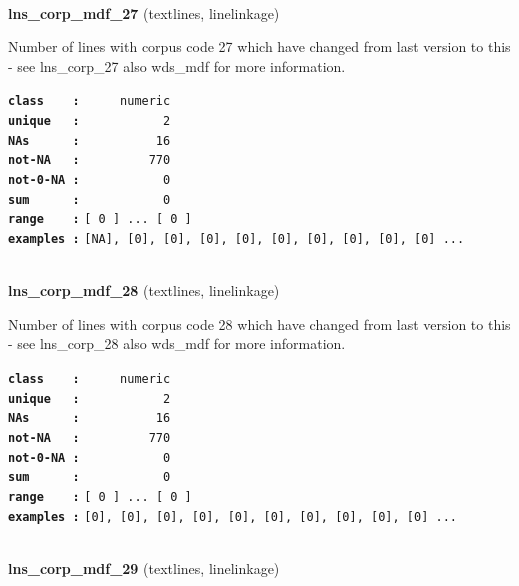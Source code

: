 \documentclass[]{article}
\begin{document}
~

\textbf{lns\_corp\_mdf\_27} (textlines, linelinkage)

Number of lines with corpus code 27 which have changed from last version
to this - see lns\_corp\_27 also wds\_mdf for more information.

\textbf{\texttt{class\ \ \ \ :}} \texttt{~~~~~numeric}\\
\textbf{\texttt{unique\ \ \ :}} \texttt{~~~~~~~~~~~2}\\
\textbf{\texttt{NAs\ \ \ \ \ \ :}} \texttt{~~~~~~~~~~16}\\
\textbf{\texttt{not-NA\ \ \ :}} \texttt{~~~~~~~~~770}\\
\textbf{\texttt{not-0-NA\ :}} \texttt{~~~~~~~~~~~0}\\
\textbf{\texttt{sum\ \ \ \ \ \ :}} \texttt{~~~~~~~~~~~0}\\
\textbf{\texttt{range\ \ \ \ :}}
\texttt{{[}\ 0\ {]}\ ...\ {[}\ 0\ {]}}\\
\textbf{\texttt{examples\ :}}
\texttt{{[}NA{]},\ {[}0{]},\ {[}0{]},\ {[}0{]},\ {[}0{]},\ {[}0{]},\ {[}0{]},\ {[}0{]},\ {[}0{]},\ {[}0{]}\ ...}\\

~

\textbf{lns\_corp\_mdf\_28} (textlines, linelinkage)

Number of lines with corpus code 28 which have changed from last version
to this - see lns\_corp\_28 also wds\_mdf for more information.

\textbf{\texttt{class\ \ \ \ :}} \texttt{~~~~~numeric}\\
\textbf{\texttt{unique\ \ \ :}} \texttt{~~~~~~~~~~~2}\\
\textbf{\texttt{NAs\ \ \ \ \ \ :}} \texttt{~~~~~~~~~~16}\\
\textbf{\texttt{not-NA\ \ \ :}} \texttt{~~~~~~~~~770}\\
\textbf{\texttt{not-0-NA\ :}} \texttt{~~~~~~~~~~~0}\\
\textbf{\texttt{sum\ \ \ \ \ \ :}} \texttt{~~~~~~~~~~~0}\\
\textbf{\texttt{range\ \ \ \ :}}
\texttt{{[}\ 0\ {]}\ ...\ {[}\ 0\ {]}}\\
\textbf{\texttt{examples\ :}}
\texttt{{[}0{]},\ {[}0{]},\ {[}0{]},\ {[}0{]},\ {[}0{]},\ {[}0{]},\ {[}0{]},\ {[}0{]},\ {[}0{]},\ {[}0{]}\ ...}\\

~

\textbf{lns\_corp\_mdf\_29} (textlines, linelinkage)
\end{document}
